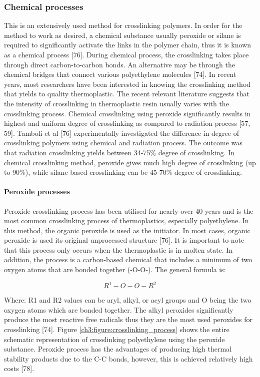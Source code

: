 \documentclass[12pt]{report}
\begin{document}
\subsubsection{Chemical processes}
This is an extensively used method for crosslinking polymers. In order for the method to work as desired, a chemical substance usually peroxide or silane is required to significantly activate the links in the polymer chain, thus it is known as a chemical process [76]. During chemical process, the crosslinking takes place through direct carbon-to-carbon bonds. An alternative may be through the chemical bridges that connect various polyethylene molecules [74].  
In recent years, most researchers have been interested in knowing the crosslinking method that yields to quality thermoplastic. The recent relevant literature suggests that the intensity of crosslinking in thermoplastic resin usually varies with the crosslinking process. Chemical crosslinking using peroxide significantly results in highest and uniform degree of crosslinking as compared to radiation process [57, 59]. Tamboli et al [76] experimentally investigated the difference in degree of crosslinking polymers using chemical and radiation process. The outcome was that radiation crosslinking yields between 34-75\% degree of crosslinking. In chemical crosslinking method, peroxide gives much high degree of crosslinking (up to 90\%), while silane-based crosslinking can be 45-70\% degree of crosslinking.

\paragraph{Peroxide processes}
 Peroxide crosslinking process has been utilised for nearly over 40 years and is the most common crosslinking process of thermoplastics, especially polyethylene. In this method, the organic peroxide is used as the initiator. In most cases, organic peroxide is used its original unprocessed structure [76]. It is important to note that this process only occurs when the thermoplastic is in molten state. In addition, the process is a carbon-based chemical that includes a minimum of two oxygen atoms that are bonded together (-O-O-). The general formula is:  

 \begin{equation}
    R^1-O-O-R^2
 \end{equation}

Where: R1 and R2 values can be aryl, alkyl, or acyl groups and O being the two oxygen atoms which are bonded together. The alkyl peroxides significantly produce the most reactive free radicals thus they are the most used peroxides for crosslinking [74]. Figure \ref{ch3:figure:crosslinking_process} shows the entire schematic representation of crosslinking polyethylene using the peroxide substance. Peroxide process has the advantages of producing high thermal stability products due to the C-C bonds, however, this is achieved relatively high costs [78].
\end{document}
